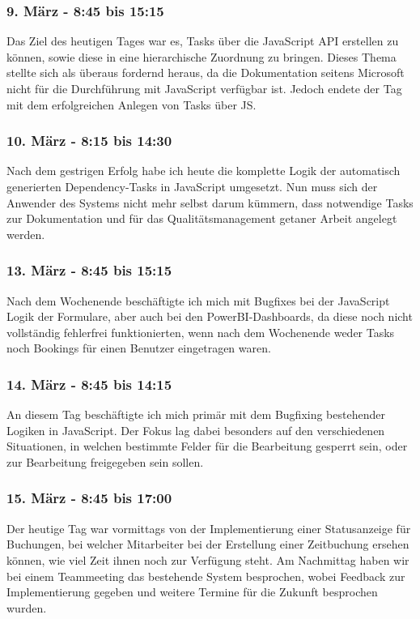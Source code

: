 \subsubsection*{9. März - 8:45 bis 15:15}
Das Ziel des heutigen Tages war es, Tasks über die JavaScript API erstellen zu können, sowie diese in eine hierarchische Zuordnung zu bringen. Dieses Thema stellte sich als überaus fordernd heraus, da die Dokumentation seitens Microsoft nicht für die Durchführung mit JavaScript verfügbar ist. Jedoch endete der Tag mit dem erfolgreichen Anlegen von Tasks über JS.

\subsubsection*{10. März - 8:15 bis 14:30}
Nach dem gestrigen Erfolg habe ich heute die komplette Logik der automatisch generierten Dependency-Tasks in JavaScript umgesetzt. Nun muss sich der Anwender des Systems nicht mehr selbst darum kümmern, dass notwendige Tasks zur Dokumentation und für das Qualitätsmanagement getaner Arbeit angelegt werden.

\subsubsection*{13. März - 8:45 bis 15:15}
Nach dem Wochenende beschäftigte ich mich mit Bugfixes bei der JavaScript Logik der Formulare, aber auch bei den PowerBI-Dashboards, da diese noch nicht vollständig fehlerfrei funktionierten, wenn nach dem Wochenende weder Tasks noch Bookings für einen Benutzer eingetragen waren.

\subsubsection*{14. März - 8:45 bis 14:15}
An diesem Tag beschäftigte ich mich primär mit dem Bugfixing bestehender Logiken in JavaScript. Der Fokus lag dabei besonders auf den verschiedenen Situationen, in welchen bestimmte Felder für die Bearbeitung gesperrt sein, oder zur Bearbeitung freigegeben sein sollen.

\subsubsection*{15. März - 8:45 bis 17:00}
Der heutige Tag war vormittags von der Implementierung einer Statusanzeige für Buchungen, bei welcher Mitarbeiter bei der Erstellung einer Zeitbuchung ersehen können, wie viel Zeit ihnen noch zur Verfügung steht. Am Nachmittag haben wir bei einem Teammeeting das bestehende System besprochen, wobei Feedback zur Implementierung gegeben und weitere Termine für die Zukunft besprochen wurden.

